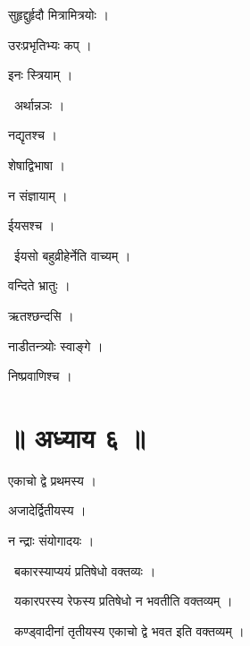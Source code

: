 \documentclass[10pt, openany, oneside]{book}
\begin{document}
\noindent सुहृद्दुर्हृदौ मित्रामित्रयोः ।

\noindent उरःप्रभृतिभ्यः कप् ।

\noindent इनः स्त्रियाम् ।

\par\noindent\hspace{1.5em}{\vps वा॰}~{\qt अर्थान्नञः ।}

\noindent नद्यृतश्च ।

\noindent शेषाद्विभाषा ।

\noindent न संज्ञायाम् ।

\noindent ईयसश्च ।

\par\noindent\hspace{1.5em}{\vps वा॰}~{\qt ईयसो बहुव्रीहेर्नेति वाच्यम् ।}

\noindent वन्दिते भ्रातुः ।

\noindent ऋतश्छन्दसि ।

\noindent नाडीतन्त्र्योः स्वाङ्गे ।

\noindent निष्प्रवाणिश्च ।

\section*{॥ अध्याय ६ ॥}

\noindent एकाचो द्वे प्रथमस्य ।

\noindent अजादेर्द्वितीयस्य ।

\noindent न न्द्राः संयोगादयः ।

\par\noindent\hspace{1.5em}{\vps वा॰}~{\qt बकारस्याप्ययं प्रतिषेधो वक्तव्यः ।}

\par\noindent\hspace{1.5em}{\vps वा॰}~{\qt यकारपरस्य रेफस्य प्रतिषेधो न भवतीति वक्तव्यम् ।}

\par\noindent\hspace{1.5em}{\vps वा॰}~{\qt कण्ड्वादीनां तृतीयस्य एकाचो द्वे भवत इति वक्तव्यम् ।}
\end{document}
